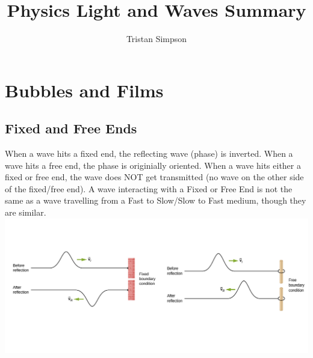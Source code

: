 \documentclass{article}
\title{Physics Light and Waves Summary}
\author{Tristan Simpson}
\begin{document}
\maketitle
\tableofcontents

\vspace{3cm}
\section{Bubbles and Films}
\subsection{Fixed and Free Ends}
When a wave hits a fixed end, the reflecting wave (phase) is inverted. When a wave hits a free end, the phase is originially oriented. When a wave hits either a fixed or free end, the wave does NOT get transmitted (no wave on the other side of the fixed/free end).
A wave interacting with a Fixed or Free End is not the same as a wave travelling from a Fast to Slow/Slow to Fast medium, though they are similar.\\
\includegraphics[scale=3]{images/fixed_free_ends} \\
\vspace{-2cm}
\end{document}
